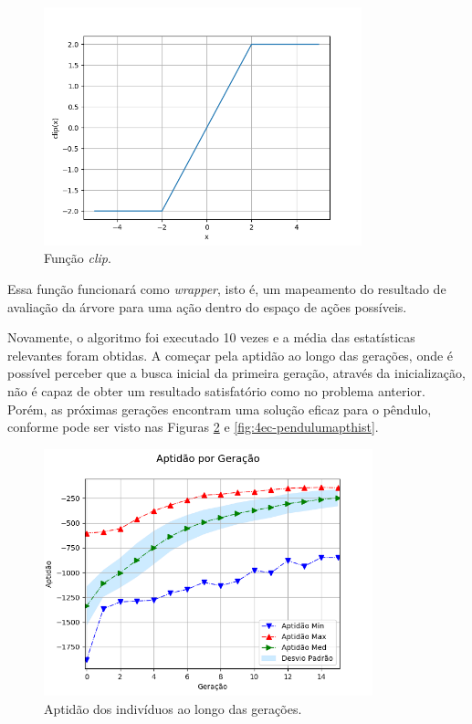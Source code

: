 \begin{figure}[H]
	\centering
	\includegraphics[width=0.82\textwidth]{02_desenvolvimento/04_EC_Fig_PendulumClipFun.png}
	\caption{Função \textit{clip}.}
	\label{fig:4ec-pendulumclip}
\end{figure}

Essa função funcionará como \textit{wrapper}, isto é, um mapeamento do resultado de avaliação da árvore para uma ação dentro do espaço de ações possíveis.

Novamente, o algoritmo foi executado 10 vezes e a média das estatísticas relevantes foram obtidas. A começar pela aptidão ao longo das gerações, onde é possível perceber que a busca inicial da primeira geração, através da inicialização, não é capaz de obter um resultado satisfatório como no problema anterior. Porém, as próximas gerações encontram uma solução eficaz para o pêndulo, conforme pode ser visto nas Figuras \ref{fig:4ec-pendulumaptger} e \ref{fig:4ec-pendulumapthist}.

\begin{figure}[H]
	\centering
	\includegraphics[width=0.85\textwidth]{02_desenvolvimento/04_EC_Fig_PendulumAptGer.png}
	\caption{Aptidão dos indivíduos ao longo das gerações.}
	\label{fig:4ec-pendulumaptger}
\end{figure}

